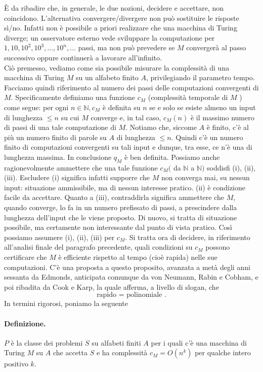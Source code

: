 È da ribadire che, in generale, le due nozioni, decidere e accettare, non
coincidono. L'alternativa convergere/divergere non può sostituire le risposte
sì/no. Infatti non è possibile a priori realizzare che una macchina di Turing
diverge; un osservatore esterno vede sviluppare la computazione per $1,10,10^2,
    10^3, \ldots, 10^n, \ldots$ passi, ma non può prevedere se $M$ convergerà al
passo successivo oppure continuerà a lavorare all'infinito.\\
Ciò premesso,
vediamo come sia possibile misurare la complessità di una macchina di Turing $M$
su un alfabeto finito $A$, privilegiando il parametro tempo. Facciamo quindi
riferimento al numero dei passi delle computazioni convergenti di $M$.
Specificamente definiamo una funzione $c_M$ (complessità temporale di $M$ ) come
segue: per ogni $n \in \mathbb{N}, c_M$ è definita su $n$ se e solo se esiste
almeno un input di lunghezza $\leq n$ su cui $M$ converge e, in tal caso,
$c_M(n)$ è il massimo numero di passi di una tale computazione di $M$. Notiamo
che, siccome $A$ è finito, c'è al più un numero finito di parole su $A$ di
lunghezza $\leq n$. Quindi c'è un numero finito di computazioni convergenti su
tali input e dunque, tra esse, ce n'è una di lunghezza massima. In conclusione
$q_M$ è ben definita. Possiamo anche ragionevolmente ammettere che una tale
funzione $c_M($ da $\mathbb{N}$ a $\mathbb{N})$ soddisfi (i), (ii), (iii).
Escludere (i) significa infatti supporre che $M$ non converga mai, su nessun
input: situazione ammissibile, ma di nessun interesse pratico.
(ii) è condizione facile da accettare. Quanto a (iii), contraddirla significa
ammettere che $M$, quando converge, lo fa in un numero prefissato di passi, a
prescindere dalla lunghezza dell'input che le viene proposto. Di nuovo, si
tratta di situazione possibile, ma certamente non interessante dal punto di
vista pratico. Così possiamo assumere (i), (ii), (iii) per $c_M$. Si tratta ora
di decidere, in riferimento all'analisi finale del paragrafo precedente, quali
condizioni su $c_M$ possono certificare che $M$ è efficiente rispetto al tempo
(cioè rapida) nelle sue computazioni. C'è una proposta a questo proposito,
avanzata a metà degli anni sessanta da Edmonds, anticipata comunque da von
Neumann, Rabin e Cobham, e poi ribadita da Cook e Karp, la quale afferma, a
livello di slogan, che
$$
    \text { rapido }=\text { polinomiale } \text {. }
$$
In termini rigorosi, poniamo la seguente \paragraph{Definizione.} $P$ è la
classe dei problemi $S$ su alfabeti finiti $A$ per i quali c'è una macchina di
Turing $M$ su $A$ che accetta $S$ e ha complessità $c_M=O\left(n^k\right)$ per
qualche intero positivo $k$.\\

